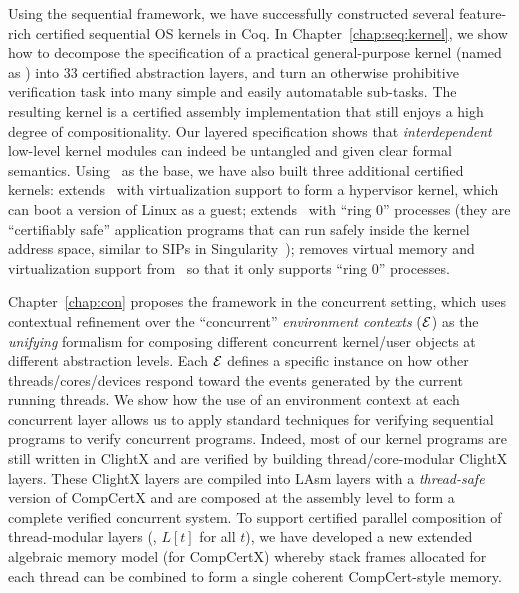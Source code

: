
Using the sequential \CTOS{} framework, we have successfully
  constructed several feature-rich certified sequential OS kernels in Coq.
In   Chapter~\ref{chap:seq:kernel},
we show how to decompose the specification of 
a practical general-purpose kernel
(named as \textbf{\mCTOS{}})
into 33 certified abstraction layers, and turn an otherwise 
  prohibitive verification task into many simple and easily automatable 
  sub-tasks.  The resulting kernel is a certified assembly implementation 
  that still enjoys a high degree of compositionality.
  Our layered specification shows that
  {\em interdependent} low-level kernel modules can indeed be
  untangled and given clear formal semantics.
 Using \mCTOS\ as the base, we have also built three additional
  certified kernels: {\bf{}\mCTOShyper} extends \mCTOS\ with virtualization
  support to form a hypervisor kernel, which can boot a version of Linux as a guest;
  {\bf{}\mCTOSringz} extends \mCTOShyper\ with ``ring 0'' processes
  (they are ``certifiably safe'' application programs that can run safely 
  inside the kernel address space, similar to SIPs in 
  Singularity~\cite{hunt07}); {\bf{}\mCTOSembed} removes virtual memory
  and virtualization support from \mCTOSringz\ so that it only supports 
  ``ring 0'' processes.
  
 Chapter~\ref{chap:con} proposes 
the \CTOS{} framework in the concurrent setting,
 which uses
  contextual refinement over the ``concurrent'' {\em environment contexts}
  ($\mathcal{E}$) as the {\em unifying} formalism for composing 
  different concurrent kernel/user objects at different
  abstraction levels.  Each $\mathcal{E}$ defines a specific instance on how
  other threads/cores/devices respond toward the events generated by
  the current running threads.  
We show how the use of an environment context at each
  concurrent layer allows us to apply standard techniques for
  verifying sequential programs to verify concurrent programs.
   Indeed, most of our kernel programs are still written 
   in ClightX and are verified by building
   thread/core-modular ClightX layers.
 These ClightX layers are compiled
 into LAsm layers
   with a {\em thread-safe} version of CompCertX
   and are composed at the assembly level to form
   a complete verified concurrent system.
 To support certified parallel composition of
  thread-modular layers (\ie, $L[t]$ for all $t$), we have developed
  a new extended algebraic memory model (for CompCertX) whereby stack
  frames allocated for each thread can be combined to form a single
  coherent CompCert-style memory.

